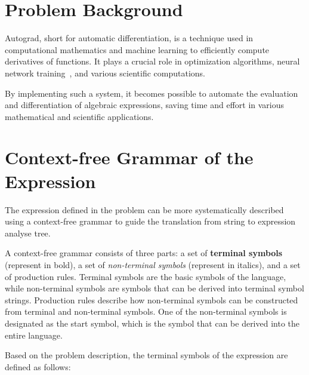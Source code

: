 \documentclass[a4paper,oneside]{book}
\begin{document}
\section{Problem Background}

Autograd, short for automatic differentiation, is a technique used in computational mathematics and machine learning to efficiently compute derivatives of functions. It plays a crucial role in optimization algorithms, neural network training~\cite{paszke2017automatic}, and various scientific computations.

By implementing such a system, it becomes possible to automate the evaluation and differentiation of algebraic expressions, saving time and effort in various mathematical and scientific applications.

\section{Context-free Grammar of the Expression}

The expression defined in the problem can be more systematically described using a context-free grammar to guide the translation from string to expression analyse tree.

A context-free grammar consists of three parts: a set of \textbf{terminal symbols} (represent in bold), a set of \textit{non-terminal symbols} (represent in italics), and a set of production rules. Terminal symbols are the basic symbols of the language, while non-terminal symbols are symbols that can be derived into terminal symbol strings. Production rules describe how non-terminal symbols can be constructed from terminal and non-terminal symbols. One of the non-terminal symbols is designated as the start symbol, which is the symbol that can be derived into the entire language.

Based on the problem description, the terminal symbols of the expression are defined as follows:
\end{document}
